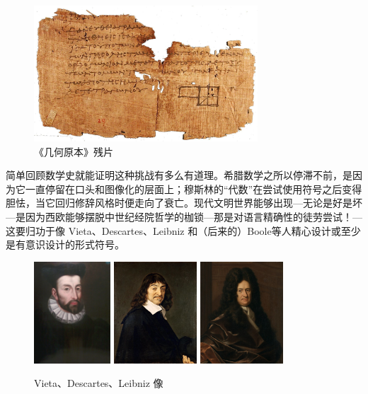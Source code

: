 \documentclass[a4paper,12pt]{article}
\begin{document}
\begin{figure}[ht]
\centering
\includegraphics[height=2.0in]{images/elements.jpeg}
\caption{《几何原本》残片}
\end{figure}

简单回顾数学史就能证明这种挑战有多么有道理。希腊数学之所以停滞不前，是因为它一直停留在口头和图像化的层面上；穆斯林的“代数”在尝试使用符号之后变得胆怯，当它回归修辞风格时便走向了衰亡。现代文明世界能够出现—无论是好是坏—是因为西欧能够摆脱中世纪经院哲学的枷锁—那是对语言精确性的徒劳尝试！—这要归功于像 Vieta、Descartes、Leibniz 和（后来的）Boole等人精心设计或至少是有意识设计的形式符号。

\begin{figure}[ht]
\centering
\includegraphics[height=1.5in]{images/Francois_Viete.jpeg}
\includegraphics[height=1.5in]{images/Descartes.jpeg}
\includegraphics[height=1.5in]{images/Leibniz.jpeg}
\caption{Vieta、Descartes、Leibniz 像}
\end{figure}
\end{document}

